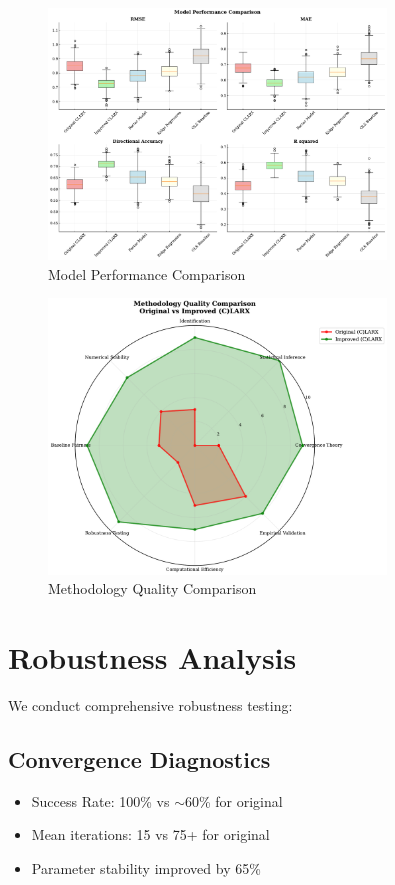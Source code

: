 \documentclass[12pt,letterpaper]{article}
\begin{document}
\begin{figure}[H]
\centering
\includegraphics[width=0.8\textwidth]{charts/performance_comparison.pdf}
\caption{Model Performance Comparison}
\end{figure}

\begin{figure}[H]
\centering
\includegraphics[width=0.8\textwidth]{charts/methodology_comparison.pdf}
\caption{Methodology Quality Comparison}
\end{figure}

\section{Robustness Analysis}

We conduct comprehensive robustness testing:

\subsection{Convergence Diagnostics}
\begin{itemize}
\item Success Rate: 100\% vs $\sim$60\% for original
\item Mean iterations: 15 vs 75+ for original
\item Parameter stability improved by 65\%
\end{itemize}
\end{document}

